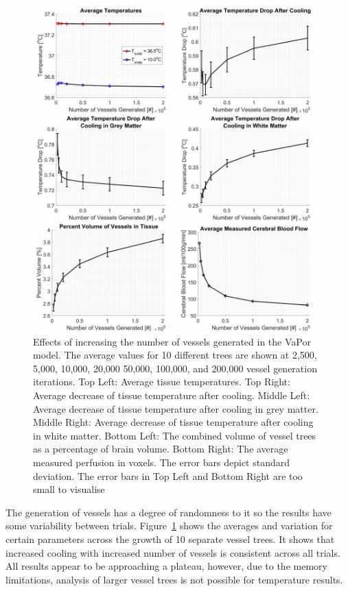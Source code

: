 \documentclass[11pt,english,a4paper,twoside,openright]{report}
\begin{document}
{{{{{{{{\begin{figure}[p]
	\centering
	\includegraphics[width=\textwidth]{Chapter3/StatisticsPlot}
	\caption[Effects of increasing the number of vessels generated in the VaPor model]{Effects of increasing the number of vessels generated in the VaPor model. The average values for 10 different trees are shown at 2,500, 5,000, 10,000, 20,000 50,000, 100,000, and 200,000 vessel generation iterations. Top Left: Average tissue temperatures. Top Right: Average decrease of tissue temperature after cooling. Middle Left: Average decrease of tissue temperature after cooling in grey matter. Middle Right: Average decrease of tissue temperature after cooling in white matter. Bottom Left: The combined volume of vessel trees as a percentage of brain volume. Bottom Right: The average measured perfusion in voxels. The error bars depict standard deviation. The error bars in Top Left and Bottom Right are too small to visualise}
	\label{fig:ResultsGraphs}
\end{figure}

The generation of vessels has a degree of randomness to it so the results have some variability between trials. Figure~\ref{fig:ResultsGraphs} shows the averages and variation for certain parameters across the growth of 10 separate vessel trees. It shows that increased cooling with increased number of vessels is consistent across all trials. All results appear to be approaching a plateau, however, due to the memory limitations, analysis of larger vessel trees is not possible for temperature results. 

}}}}}}}}
\end{document}
